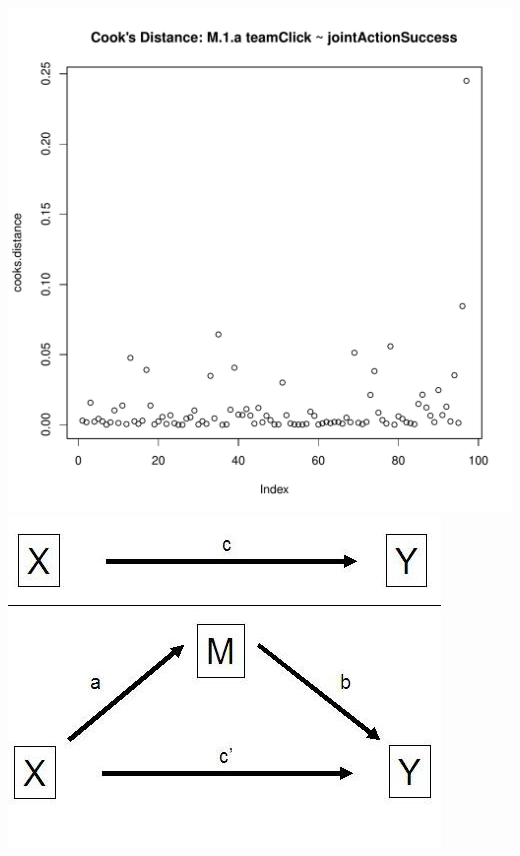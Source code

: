 \documentclass[12pt]{report}
\begin{document}
\includegraphics{../images/MLM1aCooksD.pdf}
\includegraphics{../images/mediation_image.jpg}
\end{document}
